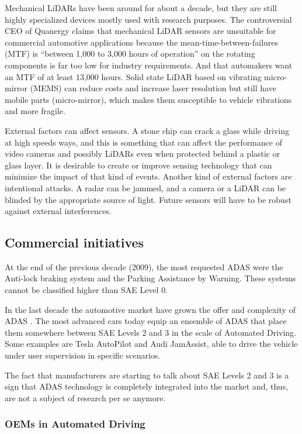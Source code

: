 Mechanical LiDARs have been around for about a decade, but they are still
highly specialized devices mostly used with research purposes.
The controversial CEO of Quanergy claims \cite{Hampstead2018} that mechanical
LiDAR sensors are unsuitable for commercial automotive applications because the
mean-time-between-failures (MTF) is
``between 1,000 to 3,000 hours of operation'' on the rotating 
components is far too low for industry requirements. And that automakers want 
an MTF of at least 13,000 hours.
Solid state LiDAR based on vibrating micro-mirror (MEMS) can reduce costs and 
increase laser resolution but still have mobile parts (micro-mirror), which
makes them susceptible to vehicle vibrations and more fragile.

External factors can affect sensors. A stone chip can crack a glass while 
driving at high speeds ways, and this is something that can affect the 
performance of video cameras and possibly LiDARs even when protected behind
a plastic or glass layer. It is desirable to create or improve sensing 
technology that can minimize the impact of that kind of events.
Another kind of external factors are intentional attacks. A radar can be jammed,
and a camera or a LiDAR can be blinded by the appropriate source of light.
Future sensors will have to be robust against external interferences.

\subsection{Commercial initiatives}

At the end of the previous decade (2009), the most requested ADAS
\cite{Frost&Sullivan2010} were the Anti-lock braking system and the Parking 
Assistance by Warning. These systems cannot be classified
higher than SAE Level 0.

In the last decade the automotive market have grown the offer and complexity
of ADAS \cite{Perez2016}. The most advanced cars today equip an ensemble of 
ADAS that place them somewhere between SAE Levels 2 and 3 in the scale of Automated
Driving. Some examples are Tesla AutoPilot and Audi JamAssist, able to
drive the vehicle under user supervision in specific scenarios.

The fact that manufacturers are starting to talk about SAE Levels 2 and 3
is a sign that ADAS technology is completely integrated into the market and, thus, are not a subject of research per se anymore.  

\subsubsection{OEMs in Automated Driving}
\label{sec:oem-ad}


